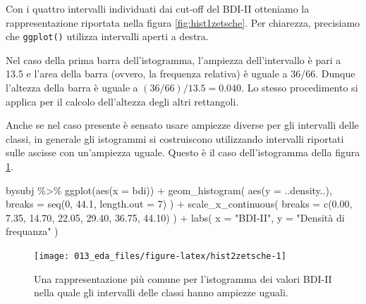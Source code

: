 \documentclass[
  10pt,
  italian,
  a4paper,
  extrafontsizes,onecolumn,openright
  ]{memoir}
\newenvironment{Shaded}{\begin{snugshade}}{\end{snugshade}}
\newcommand{\AttributeTok}[1]{\textcolor[rgb]{0.77,0.63,0.00}{#1}}
\newcommand{\DecValTok}[1]{\textcolor[rgb]{0.00,0.00,0.81}{#1}}
\newcommand{\FloatTok}[1]{\textcolor[rgb]{0.00,0.00,0.81}{#1}}
\newcommand{\FunctionTok}[1]{\textcolor[rgb]{0.00,0.00,0.00}{#1}}
\newcommand{\NormalTok}[1]{#1}
\newcommand{\SpecialCharTok}[1]{\textcolor[rgb]{0.00,0.00,0.00}{#1}}
\newcommand{\StringTok}[1]{\textcolor[rgb]{0.31,0.60,0.02}{#1}}
\theoremstyle{definition}
\theoremstyle{definition}
\theoremstyle{definition}
\theoremstyle{definition}
\theoremstyle{remark}
\begin{document}
Con i quattro intervalli individuati dai cut-off del BDI-II otteniamo la
rappresentazione riportata nella figura \ref{fig:hist1zetsche}. Per chiarezza, precisiamo che \texttt{ggplot()} utilizza intervalli aperti a destra.

Nel caso della prima barra dell'istogramma, l'ampiezza dell'intervallo è pari a 13.5 e l'area della barra (ovvero, la frequenza relativa) è uguale a 36/66. Dunque l'altezza della barra è uguale a \((36 / 66) / 13.5 = 0.040\). Lo stesso procedimento si applica per il calcolo dell'altezza degli altri rettangoli.

Anche se nel caso presente è sensato usare ampiezze diverse per gli intervalli delle classi, in generale gli istogrammi si costruiscono utilizzando intervalli riportati sulle ascisse con un'ampiezza uguale. Questo è il caso dell'istogramma della figura \ref{fig:hist2zetsche}.

\begin{Shaded}
\begin{Highlighting}[]
\NormalTok{bysubj }\SpecialCharTok{\%\textgreater{}\%}
  \FunctionTok{ggplot}\NormalTok{(}\FunctionTok{aes}\NormalTok{(}\AttributeTok{x =}\NormalTok{ bdi)) }\SpecialCharTok{+}
  \FunctionTok{geom\_histogram}\NormalTok{(}
    \FunctionTok{aes}\NormalTok{(}\AttributeTok{y =}\NormalTok{ ..density..),}
    \AttributeTok{breaks =} \FunctionTok{seq}\NormalTok{(}\DecValTok{0}\NormalTok{, }\FloatTok{44.1}\NormalTok{, }\AttributeTok{length.out =} \DecValTok{7}\NormalTok{)}
\NormalTok{  ) }\SpecialCharTok{+}
  \FunctionTok{scale\_x\_continuous}\NormalTok{(}
    \AttributeTok{breaks =} \FunctionTok{c}\NormalTok{(}\FloatTok{0.00}\NormalTok{, }\FloatTok{7.35}\NormalTok{, }\FloatTok{14.70}\NormalTok{, }\FloatTok{22.05}\NormalTok{, }
               \FloatTok{29.40}\NormalTok{, }\FloatTok{36.75}\NormalTok{, }\FloatTok{44.10}\NormalTok{)}
\NormalTok{  ) }\SpecialCharTok{+}
  \FunctionTok{labs}\NormalTok{(}
    \AttributeTok{x =} \StringTok{"BDI{-}II"}\NormalTok{,}
    \AttributeTok{y =} \StringTok{"Densità di frequanza"}
\NormalTok{  ) }
\end{Highlighting}
\end{Shaded}

\begin{figure}[h]

{\centering \texttt{[image: 013\_eda\_files/figure-latex/hist2zetsche-1]} 

}

\caption{Una rappresentazione più comune per l'istogramma dei valori BDI-II nella quale gli intervalli delle classi hanno ampiezze uguali.}\label{fig:hist2zetsche}
\end{figure}
\end{document}
